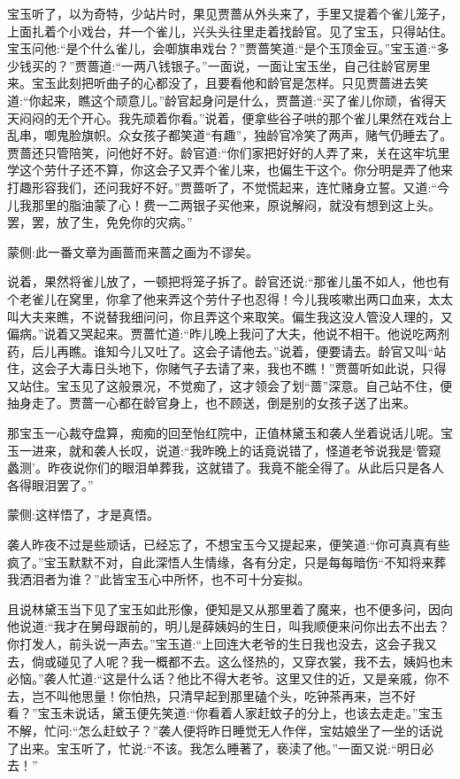 \begin{parag}
    宝玉听了，以为奇特，少站片时，果见贾蔷从外头来了，手里又提着个雀儿笼子，上面扎着个小戏台，幷一个雀儿，兴头头往里走着找龄官。见了宝玉，只得站住。宝玉问他:“是个什么雀儿，会啣旗串戏台？”贾蔷笑道:“是个玉顶金豆。”宝玉道:“多少钱买的？”贾蔷道:“一两八钱银子。”一面说，一面让宝玉坐，自己往龄官房里来。宝玉此刻把听曲子的心都没了，且要看他和龄官是怎样。只见贾蔷进去笑道:“你起来，瞧这个顽意儿。”龄官起身问是什么，贾蔷道:“买了雀儿你顽，省得天天闷闷的无个开心。我先顽着你看。”说着，便拿些谷子哄的那个雀儿果然在戏台上乱串，啣鬼脸旗帜。众女孩子都笑道“有趣”，独龄官冷笑了两声，赌气仍睡去了。贾蔷还只管陪笑，问他好不好。龄官道:“你们家把好好的人弄了来，关在这牢坑里学这个劳什子还不算，你这会子又弄个雀儿来，也偏生干这个。你分明是弄了他来打趣形容我们，还问我好不好。”贾蔷听了，不觉慌起来，连忙赌身立誓。又道:“今儿我那里的脂油蒙了心！费一二两银子买他来，原说解闷，就没有想到这上头。罢，罢，放了生，免免你的灾病。”\begin{note}蒙侧:此一番文章为画蔷而来蔷之画为不谬矣。\end{note}说着，果然将雀儿放了，一顿把将笼子拆了。龄官还说:“那雀儿虽不如人，他也有个老雀儿在窝里，你拿了他来弄这个劳什子也忍得！今儿我咳嗽出两口血来，太太叫大夫来瞧，不说替我细问问，你且弄这个来取笑。偏生我这没人管没人理的，又偏病。”说着又哭起来。贾蔷忙道:“昨儿晚上我问了大夫，他说不相干。他说吃两剂药，后儿再瞧。谁知今儿又吐了。这会子请他去。”说着，便要请去。龄官又叫“站住，这会子大毒日头地下，你赌气子去请了来，我也不瞧！”贾蔷听如此说，只得又站住。宝玉见了这般景况，不觉痴了，这才领会了划“蔷”深意。自己站不住，便抽身走了。贾蔷一心都在龄官身上，也不顾送，倒是别的女孩子送了出来。
\end{parag}


\begin{parag}
    那宝玉一心裁夺盘算，痴痴的回至怡红院中，正值林黛玉和袭人坐着说话儿呢。宝玉一进来，就和袭人长叹，说道:“我昨晚上的话竟说错了，怪道老爷说我是‘管窥蠡测’。昨夜说你们的眼泪单葬我，这就错了。我竟不能全得了。从此后只是各人各得眼泪罢了。”\begin{note}蒙侧:这样悟了，才是真悟。\end{note}袭人昨夜不过是些顽话，已经忘了，不想宝玉今又提起来，便笑道:“你可真真有些疯了。”宝玉默默不对，自此深悟人生情缘，各有分定，只是每每暗伤“不知将来葬我洒泪者为谁？”此皆宝玉心中所怀，也不可十分妄拟。
\end{parag}


\begin{parag}
    且说林黛玉当下见了宝玉如此形像，便知是又从那里着了魔来，也不便多问，因向他说道:“我才在舅母跟前的，明儿是薛姨妈的生日，叫我顺便来问你出去不出去？你打发人，前头说一声去。”宝玉道:“上回连大老爷的生日我也没去，这会子我又去，倘或碰见了人呢？我一概都不去。这么怪热的，又穿衣裳，我不去，姨妈也未必恼。”袭人忙道:“这是什么话？他比不得大老爷。这里又住的近，又是亲戚，你不去，岂不叫他思量！你怕热，只清早起到那里磕个头，吃钟茶再来，岂不好看？”宝玉未说话，黛玉便先笑道:“你看着人家赶蚊子的分上，也该去走走。”宝玉不解，忙问:“怎么赶蚊子？”袭人便将昨日睡觉无人作伴，宝姑娘坐了一坐的话说了出来。宝玉听了，忙说:“不该。我怎么睡著了，亵渎了他。”一面又说:“明日必去！”
\end{parag}


